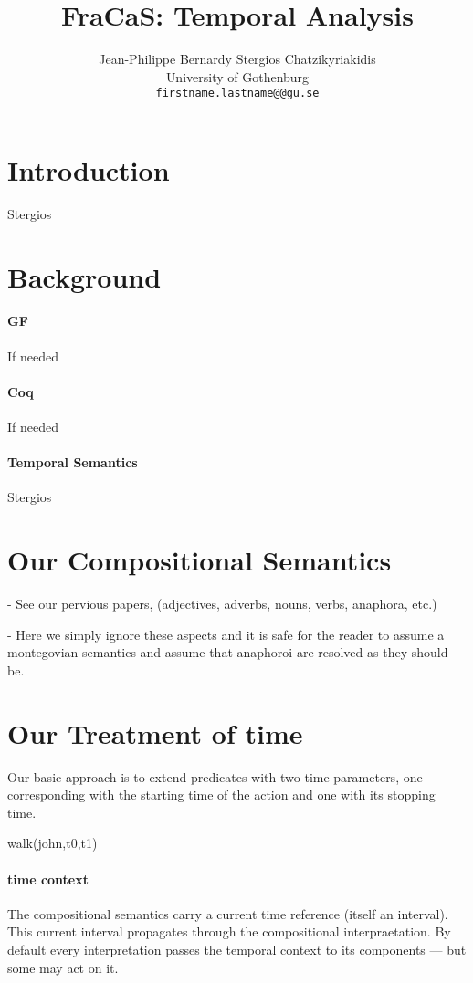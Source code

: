 \documentclass[a4paper,11pt]{article}
\title{FraCaS: Temporal Analysis}
\author{Jean-Philippe Bernardy \qquad Stergios Chatzikyriakidis \\
  University of Gothenburg\\
  {\tt firstname.lastname@@gu.se} \\}
\date{}
\begin{document}
\maketitle

\section{Introduction}
Stergios
\section{Background}
\paragraph{GF}
If needed
\paragraph{Coq}
If needed
\paragraph{Temporal Semantics}
Stergios

\section{Our Compositional Semantics}

- See our pervious papers, (adjectives, adverbs, nouns, verbs, anaphora, etc.)

- Here we simply ignore these aspects and it is safe for the reader to
assume a montegovian semantics and assume that anaphoroi are resolved
as they should be.

\section{Our Treatment of time}

Our basic approach is to extend predicates with two time parameters,
one corresponding with the starting time of the action and one with
its stopping time.

walk(john,t0,t1)

\paragraph{time context}

The compositional semantics carry a current time reference (itself an
interval). This current interval propagates through the compositional
interpraetation. By default every interpretation passes the temporal
context to its components --- but some may act on it.
\end{document}
